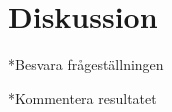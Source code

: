 
\section{Diskussion}
\label{sec:Lieth_Wahid-discussion}

*Besvara frågeställningen



*Kommentera resultatet
